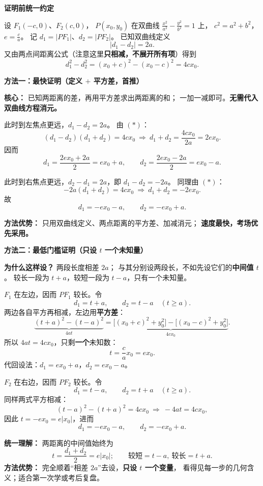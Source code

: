 \begin{proofbox}

\textbf{\textcolor{CProof}{证明前统一约定}}

设 $F_1(-c,0)$、$F_2(c,0)$，
$P(x_0,y_0)$ 在双曲线
$\frac{x^2}{a^2}-\frac{y^2}{b^2}=1$ 上，
$c^2=a^2+b^2$，$e=\frac ca$。
记 $d_1=|PF_1|$、$d_2=|PF_2|$。
已知双曲线定义
\[
 |d_1-d_2|=2a.
\]
又由两点间距离公式（注意这里\textbf{只相减，不展开所有项}）得到
\[
 \boxed{d_1^2-d_2^2
 =(x_0+c)^2-(x_0-c)^2=4cx_0.}\tag{*}
\]

\medskip
\textbf{\textcolor{CProof}{方法一：最快证明（定义 $+$ 平方差，首推）}}

\textbf{核心：} 已知两距离的差，再用平方差求出两距离的和；
一加一减即可。\textbf{无需代入双曲线方程消元。}

\begin{description}[style=nextline,leftmargin=2.8em,labelsep=0.5em,itemsep=0.45em]
 \item[\textbf{右支 $x_0\ge a$：}]
  此时到左焦点更远，$d_1-d_2=2a$。
  由 $(*)$：
  \[
   (d_1-d_2)(d_1+d_2)=4cx_0
   \ \Longrightarrow\ d_1+d_2=\frac{4cx_0}{2a}=2ex_0.
  \]
  因而
  \[
   \boxed{d_1=\frac{2ex_0+2a}{2}=ex_0+a},\qquad
   \boxed{d_2=\frac{2ex_0-2a}{2}=ex_0-a}.
  \]
 \item[\textbf{左支 $x_0\le-a$：}]
  此时到右焦点更远，$d_2-d_1=2a$，即 $d_1-d_2=-2a$。
  同理由 $(*)$：
  \[
   -2a(d_1+d_2)=4cx_0
   \ \Longrightarrow\ d_1+d_2=-2ex_0.
  \]
  故
  \[
   \boxed{d_1=-ex_0-a},\qquad
   \boxed{d_2=-ex_0+a}.
  \]
\end{description}
\textbf{方法优势：} 只用双曲线定义、两点距离的平方差、加减消元；
\textbf{速度最快，考场优先采用。}

\medskip
\textbf{\textcolor{CProof}{方法二：最低门槛证明（只设 $t$ 一个未知量）}}

\textbf{为什么这样设？} 两段长度相差 $2a$；
与其分别设两段长，不如先设它们的\textbf{中间值 $t$}。
较长一段为 $t+a$，较短一段为 $t-a$，只有一个未知量。

\begin{description}[style=nextline,leftmargin=2.8em,labelsep=0.5em,itemsep=0.5em]
 \item[\textbf{右支：}]
  $F_1$ 在左边，因而 $PF_1$ 较长。令
  \[
    d_1=t+a,\qquad d_2=t-a\quad(t\ge a).
  \]
  两边各自平方再相减，左边用\textbf{平方差}：
  \[
   \underbrace{(t+a)^2-(t-a)^2}_{4at}
   =\underbrace{\bigl[(x_0+c)^2+y_0^2\bigr]
             -\bigl[(x_0-c)^2+y_0^2\bigr]}_{4cx_0}.
  \]
  所以 $4at=4cx_0$，只剩\textbf{一个}未知数：
  \[
     \boxed{t=\frac ca x_0=ex_0}.
  \]
  代回设法：$d_1=ex_0+a$，$d_2=ex_0-a$。
 \item[\textbf{左支：}]
  $F_2$ 在右边，因而 $PF_2$ 较长。令
  \[
    d_1=t-a,\qquad d_2=t+a\quad(t\ge a).
  \]
  同样两式平方相减：
  \[
    (t-a)^2-(t+a)^2=4cx_0
    \ \Longrightarrow\ -4at=4cx_0,
  \]
  因此 $t=-ex_0=e|x_0|$，进而
  \[
     d_1=-ex_0-a,\qquad d_2=-ex_0+a.
  \]
\end{description}
\textbf{统一理解：} 两距离的中间值始终为
\[
 \boxed{t=\frac{d_1+d_2}{2}=e|x_0|};\qquad
 \boxed{\text{较短}=t-a,\ \text{较长}=t+a}.
\]
\textbf{方法优势：} 完全顺着“相差 $2a$”去设，\textbf{只设 $t$ 一个变量}，
看得见每一步的几何含义；适合第一次学或考后复盘。


\end{proofbox}

